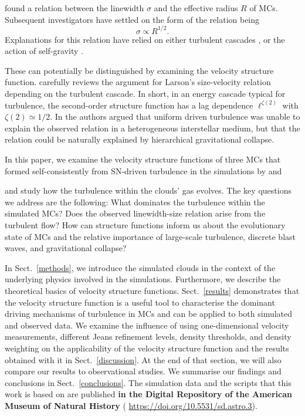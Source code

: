 \citet{Larson1981} found a relation between the linewidth $\sigma$ and the effective radius $R$ of MCs.
Subsequent investigators have settled on the form of the relation being \citep{Solomon1987,Falgarone2009,Heyer2009}
\begin{equation} \label{eq:larson}
    \sigma \propto R^{1/2}.
\end{equation}
Explanations for this relation have relied on either turbulent cascades \citep{Larson1981,Kritsuk2013,Kritsuk2015,Gnedin2015,Padoan2016}, or the action of self-gravity \citep{Elmegreen1993,Vazquez2006,Elmegreen2007,Heyer2009,Ballesteros2011}.

These can potentially be distinguished by examining the velocity structure function.
\citet{Kritsuk2013} carefully reviews the argument for Larson's size-velocity relation depending on the turbulent cascade. 
In short, in an energy cascade typical for turbulence, the second-order structure function has a lag dependence $\ell^{\zeta(2)}$ with $\zeta(2) \simeq 1/2$. 
In \citet[hereafter ]{IbanezMejia2016} the authors argued that uniform driven turbulence was unable to explain the observed relation in a heterogeneous interstellar medium, but that the relation could be naturally explained by hierarchical gravitational collapse.

In this paper, we examine the velocity structure functions of three MCs that formed self-consistently from SN-driven turbulence in the simulations by
     and \citet[][hereafter
    ]{IbanezMejia2017}

and study how the turbulence within the clouds' gas evolves.
The key questions we address are the following:
What dominates the turbulence within the simulated MCs? 
Does the observed linewidth-size relation arise from the turbulent flow?
How can structure functions inform us about the evolutionary state of MCs and the relative importance of large-scale turbulence, discrete blast waves, and gravitational collapse?

In Sect.~\ref{methods}, we introduce the simulated clouds in the context of the underlying physics involved in the simulations.
Furthermore, we describe the theoretical basics of velocity structure functions.
Sect.~\ref{results} demonstrates that the velocity structure function is a useful tool to characterise the dominant driving mechanisms of turbulence in MCs and can be applied to both simulated and observed data. 
We examine the influence of using one-dimensional velocity measurements, different Jeans refinement levels, density thresholds, and density weighting on the applicability of the velocity structure function and the results obtained with it in Sect.~\ref{discussion}.  
At the end of that section, we will also compare our results to observational studies.
We summarise our findings and conclusions in Sect.~\ref{conclusions}.
The simulation data and the scripts that this work is based on are published
   \textbf{in the Digital Repository of the American Museum of Natural History} ( {\url{https://doi.org/10.5531/sd.astro.3}}).




\endinput
